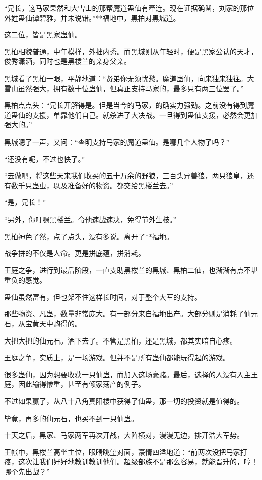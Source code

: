 \begin{this_body}
“兄长，这马家果然和大雪山的那帮魔道蛊仙有牵连。现在证据确凿，刘家的那位外姓蛊仙谭碧雅，并未说错。”**福地中，黑柏对黑城道。

这二位，皆是黑家蛊仙。

黑柏相貌普通，中年模样，外拙内秀。而黑城则从年轻时，便是黑家公认的天才，俊秀潇洒，同时也是黑楼兰的亲身父亲。

黑城看了黑柏一眼，平静地道：“贤弟你无须忧愁。魔道蛊仙，向来独来独往。大雪山虽然强大，拥有数十位蛊仙，但真正支持马家的，最多只有两三位罢了。”

黑柏点点头：“兄长开解得是。但是当今的马家，的确实力强劲。之前没有得到魔道蛊仙的支援，单靠他们自己。就杀进了大决战。一旦得到蛊仙支援，必然会更加强大的。”

黑城嗯了一声，又问：“查明支持马家的魔道蛊仙。是哪几个人物了吗？”

“还没有呢，不过也快了。”

“去做吧，将这些天来我们收买的五十万余的野狼，三百头异兽狼，两只狼皇，还有数千只蛊虫，以及准备好的物资。都交给黑楼兰去。”

“是，兄长！”

“另外，你叮嘱黑楼兰。令他速战速决，免得节外生枝。”

黑柏神色了然，点了点头，没有多说。离开了**福地。

战争拼的不仅是人命。更是拼底蕴，拼消耗。

王庭之争，进行到最后阶段，一直支助黑楼兰的黑城、黑柏二仙，也渐渐有点不堪重负的感觉。

蛊仙虽然富有，但也架不住这样长时间，对于整个大军的支持。

那些物资、凡蛊，数量非常庞大。有一部分来自福地出产。大部分则是消耗了仙元石，从宝黄天中购得的。

大把大把的仙元石。洒下去了。不管是黑柏，还是黑城，都其实暗自心疼。

王庭之争，实质上，是一场游戏。但并不是所有蛊仙都能玩得起的游戏。

很多蛊仙，因为想要收获一只仙蛊，而加入这场豪赌。最后，选择的人没有入主王庭，因此输得惨重，甚至有倾家荡产的例子。

不过如果赢了，从八十八角真阳楼中获得了仙蛊，那一切的投资就是值得的。

毕竟，再多的仙元石，也买不到一只仙蛊。

十天之后，黑家、马家两军再次开战，大阵横对，漫漫无边，排开浩大军势。

王帐中，黑楼兰高坐主位，眼睛眺望对面，豪情四溢地道：“前两次没把马家打疼，这次让我们好好地教训教训他们。超级部族不是那么容易，就能晋升的，哼！哪个先出战？”


\end{this_body}
